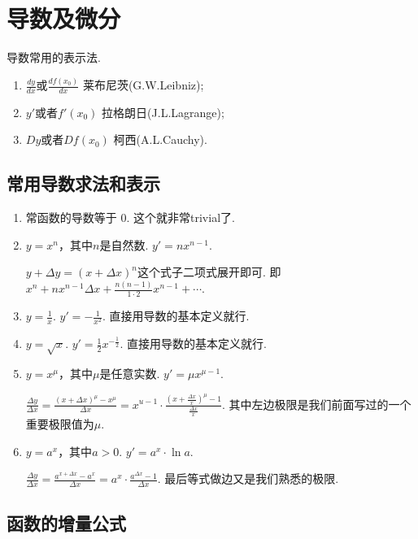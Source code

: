 \documentclass{article}
\begin{document}
\newpage
\section{导数及微分}

导数常用的表示法.

\begin{enumerate}
	\item $\frac{dy}{dx}$或$\frac{df(x_0)}{dx}$ 莱布尼茨(G.W.Leibniz);
	\item $y'$或者$f'(x_0)$ 拉格朗日(J.L.Lagrange);
	\item $Dy$或者$Df(x_0)$ 柯西(A.L.Cauchy).
\end{enumerate}

\subsection{常用导数求法和表示}

\begin{enumerate}
	\item 常函数的导数等于{ \color{blue} $0$}. 这个就非常trivial了.
	\item $y=x^n$，其中$n$是自然数. {\color{blue} $y' = nx^{n-1}.$}

$y+\Delta y = (x+\Delta x)^n$这个式子二项式展开即可. 即$x^n + nx^{n-1}\Delta x + \frac{n(n-1)}{1 \cdot 2}x^{n-1}+ \cdots$.	
	
	\item $y=\frac{1}{x}$. {\color{blue} $y'=-\frac{1}{x^2}$}. 直接用导数的基本定义就行.
	\item $y=\sqrt{x}$. {\color{blue} $y' = \frac{1}{2}x^{-\frac{1}{2}}$.} 直接用导数的基本定义就行.
	\item $y=x^\mu$，其中$\mu$是任意实数. {\color{blue} $y' = \mu x^{\mu - 1}$.}
	
$\frac{\Delta y}{\Delta x} =  \frac{(x+\Delta x)^{\mu} - x^\mu}{\Delta x} =  x^{u-1} \cdot  \frac{(x+\frac{\Delta x}{x})^\mu - 1}{\frac{\Delta x}{x}}$. 其中左边极限是我们前面写过的一个重要极限值为$\mu$.	
	\item $y=a^x$，其中$a >0$. { \color{blue} $y' = a^x \cdot \ln a$.}
	
$\frac{\Delta y}{\Delta x} =\frac{a^{x + \Delta x} - a^x}{\Delta x} =  a^x \cdot \frac{a^{\Delta x} - 1}{\Delta x}$. 最后等式做边又是我们熟悉的极限.
\end{enumerate}

\newpage
\subsection{函数的增量公式}
\end{document}
